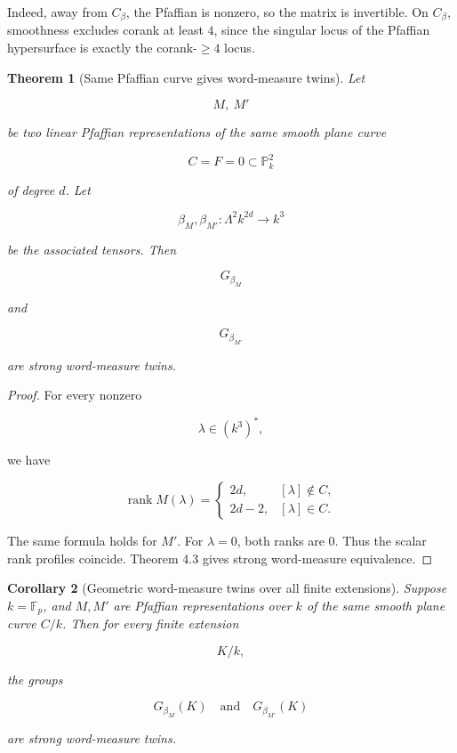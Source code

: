 \documentclass[11pt]{article}
\newtheorem{theorem}{Theorem}[section]
\newtheorem{corollary}[theorem]{Corollary}
\begin{document}
Indeed, away from $C_\beta$, the Pfaffian is nonzero, so the matrix is invertible. On $C_\beta$, smoothness excludes corank at least $4$, since the singular locus of the Pfaffian hypersurface is exactly the corank-$\ge4$ locus.

\begin{theorem}[Same Pfaffian curve gives word-measure twins]
Let

\[
M,\ M'
\]

be two linear Pfaffian representations of the same smooth plane curve

\[
C={F=0}\subset\mathbb P^2_k
\]

of degree $d$. Let

\[
\beta_M,\beta_{M'}:\Lambda^2k^{2d}\to k^3
\]

be the associated tensors. Then

\[
G_{\beta_M}
\]

and

\[
G_{\beta_{M'}}
\]

are strong word-measure twins.

\end{theorem}

\begin{proof}
For every nonzero

\[
\lambda\in(k^3)^*,
\]

we have

\[
\operatorname{rank}M(\lambda)
=\begin{cases}
2d, & [\lambda]\notin C,\\
2d-2, & [\lambda]\in C.
\end{cases}
\]

The same formula holds for $M'$. For $\lambda=0$, both ranks are $0$. Thus the scalar rank profiles coincide. Theorem 4.3 gives strong word-measure equivalence.

\end{proof}

\begin{corollary}[Geometric word-measure twins over all finite extensions]
Suppose $k=\mathbb F_p$, and $M,M'$ are Pfaffian representations over $k$ of the same smooth plane curve $C/k$. Then for every finite extension

\[
K/k,
\]

the groups

\[
G_{\beta_M}(K)
\quad\text{and}\quad
G_{\beta_{M'}}(K)
\]

are strong word-measure twins.

\end{corollary}
\end{document}
